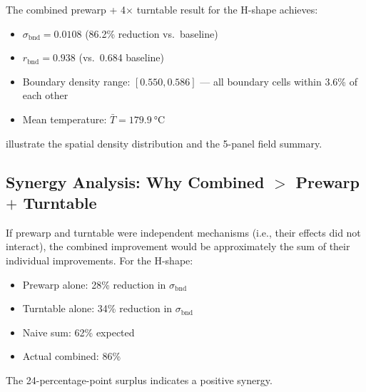 \documentclass[5p,times]{elsarticle}
\newcommand{\bndstd}{\sigma_{\mathrm{bnd}}}
\begin{document}
The combined prewarp + 4$\times$ turntable result for the H-shape
achieves:
\begin{itemize}
  \item $\bndstd = 0.0108$ (86.2\% reduction vs.\ baseline)
  \item $r_{\mathrm{bnd}} = 0.938$ (vs.\ 0.684 baseline)
  \item Boundary density range: $[0.550, 0.586]$ --- all boundary cells
        within 3.6\% of each other
  \item Mean temperature: $\bar{T} = \SI{179.9}{\celsius}$
\end{itemize}
 illustrate the spatial
density distribution and the 5-panel field summary.

\subsection{Synergy Analysis: Why Combined $>$ Prewarp $+$ Turntable}

If prewarp and turntable were independent mechanisms (i.e., their
effects did not interact), the combined improvement would be
approximately the sum of their individual improvements.  For the
H-shape:
\begin{itemize}
  \item Prewarp alone: 28\% reduction in $\bndstd$
  \item Turntable alone: 34\% reduction in $\bndstd$
  \item Naive sum: 62\% expected
  \item Actual combined: 86\%
\end{itemize}
The 24-percentage-point surplus indicates a positive synergy.
\end{document}
